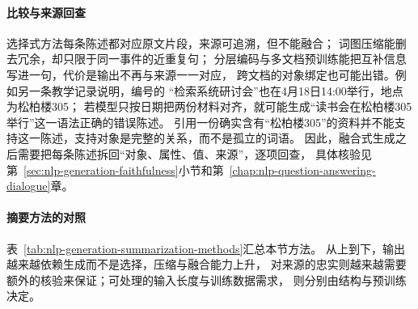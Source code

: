 \paragraph{比较与来源回查}
选择式方法每条陈述都对应原文片段，来源可追溯，但不能融合；
词图压缩能删去冗余，却只限于同一事件的近重复句；
分层编码与多文档预训练能把互补信息写进一句，代价是输出不再与来源一一对应，
跨文档的对象绑定也可能出错。例如另一条教学记录说明，编号的
“检索系统研讨会”也在4月18日14:00举行，地点为松柏楼305；
若模型只按日期把两份材料对齐，就可能生成“读书会在松柏楼305举行”这一语法正确的错误陈述。
引用一份确实含有“松柏楼305”的资料并不能支持这一陈述，支持对象是完整的关系，而不是孤立的词语。
因此，融合式生成之后需要把每条陈述拆回“对象、属性、值、来源”，逐项回查，
具体核验见第~\ref{sec:nlp-generation-faithfulness}小节和第~\ref{chap:nlp-question-answering-dialogue}章。

\paragraph{摘要方法的对照}
表~\ref{tab:nlp-generation-summarization-methods}汇总本节方法。
从上到下，输出越来越依赖生成而不是选择，压缩与融合能力上升，
对来源的忠实则越来越需要额外的核验来保证；可处理的输入长度与训练数据需求，
则分别由结构与预训练决定。


